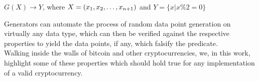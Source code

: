 \begin{center}
$G(X) \rightarrow {Y}$, where $X=\aDEFvector[x]{n+1}$ and $Y=\{x | x \% 2 = 0\}$
\end{center}
Generators can automate the process of random data point generation on virtually any data type, which can then be verified against the respective properties to yield the data points, if any, which falsify the predicate.\\
Walking inside the walls of bitcoin and other cryptocurrencies, we, in this work, highlight some of these properties which should hold true for any implementation of a valid cryptocurrency.